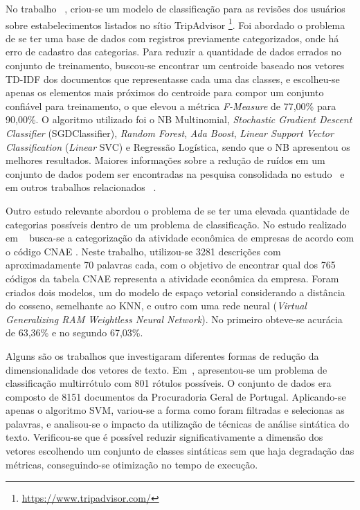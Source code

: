 
No trabalho ~\cite{tripadivisor}, criou-se um modelo de classificação para as revisões dos usuários sobre estabelecimentos listados no sítio TripAdvisor \footnote{\url{https://www.tripadvisor.com/}}. Foi abordado o problema de se ter uma base de dados com registros previamente categorizados, onde há erro de cadastro das categorias. 
Para reduzir a quantidade de dados errados no conjunto de treinamento, buscou-se encontrar um centroide baseado nos vetores TD-IDF dos documentos que representasse cada uma das classes, e escolheu-se apenas os elementos mais próximos do centroide para compor um conjunto confiável para treinamento, o que elevou a métrica \textit{F-Measure } de 77,00\% para 90,00\%. O algoritmo utilizado foi o NB Multinomial, \textit{Stochastic Gradient Descent Classifier} (SGDClassifier), \textit{Random Forest}, \textit{Ada Boost}, \textit{Linear Support Vector Classification} (\textit{Linear} SVC) e Regressão Logística, sendo que o NB apresentou os melhores resultados. Maiores informações sobre a redução de ruídos em um conjunto de dados podem ser encontradas na pesquisa consolidada no estudo~\cite{mislabeled_survey} e em outros trabalhos relacionados ~\cite{liu_preprocessing_2017,svmop}.



Outro estudo relevante abordou o problema de se ter uma elevada quantidade de categorias possíveis dentro de um problema de classificação. No estudo realizado em ~\cite{oliveira_intelligent_nodate} busca-se a categorização da atividade econômica de empresas de acordo com o código CNAE . Neste trabalho, utilizou-se 3281 descrições com aproximadamente 70 palavras cada, com o objetivo de encontrar qual dos 765 códigos da tabela CNAE representa a atividade econômica da empresa. Foram criados dois modelos, um do modelo de espaço vetorial considerando a distância do cosseno, semelhante ao KNN, e outro com uma rede neural (\textit{Virtual  Generalizing RAM Weightless Neural Network}). 
No primeiro obteve-se acurácia de 63,36\% e no segundo 67,03\%. 




Alguns são os trabalhos que investigaram diferentes formas de redução da dimensionalidade dos vetores de texto. Em~\cite{goncalves_is_2005}, apresentou-se um problema de classificação multirrótulo com 801 rótulos possíveis. O conjunto de dados era composto de 8151 documentos da Procuradoria Geral de Portugal. Aplicando-se apenas o algoritmo SVM, variou-se a forma como foram filtradas e selecionas as palavras, e analisou-se o impacto da utilização de técnicas de análise sintática do texto. Verificou-se que é possível reduzir significativamente a dimensão dos vetores escolhendo um conjunto de classes sintáticas sem que haja degradação das métricas, conseguindo-se otimização no tempo de execução. 

